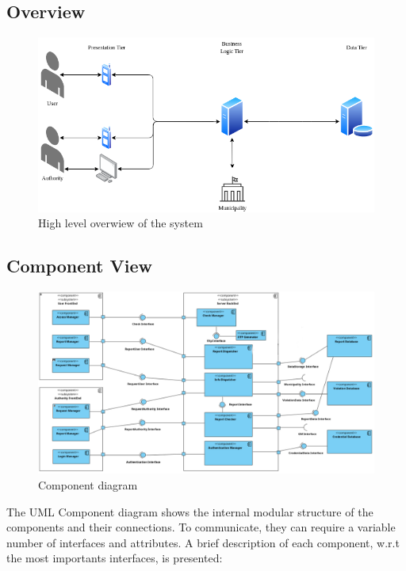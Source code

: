 \subsection{Overview}

    \begin{figure}[H]
        \includegraphics[width=\textwidth]{Images/SystemOverview.png}
        \caption{\label{fig:SystemOverview}High level overwiew of the system}
    \end{figure}
   
\newpage

\subsection{Component View}

    \begin{figure}[H]
        \includegraphics[width=\textwidth]{Images/ComponentView.png}
        \caption{\label{fig:ComponentView}Component diagram}
    \end{figure}

    The UML Component diagram shows the internal modular 
    structure of the components and their connections. 
    To communicate, they can require a variable number 
    of interfaces and attributes. 
    A brief description of each component, w.r.t the 
    most importants interfaces, is presented:

